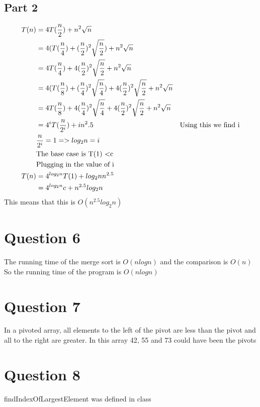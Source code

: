 \documentclass{article}
\begin{document}
    \subsection{Part 2}
        \begin{align*}
            T(n) &= 4T(\frac{n}{2}) + n^2\sqrt{n}\\
            &= 4(T(\frac{n}{4}) + (\frac{n}{2})^2 \sqrt{\frac{n}{2}}) + n^2\sqrt{n}\\
            &= 4T(\frac{n}{4}) + 4(\frac{n}{2})^2 \sqrt{\frac{n}{2}} + n^2\sqrt{n}\\
            &= 4(T(\frac{n}{8}) + (\frac{n}{4})^2 \sqrt{\frac{n}{4}}) + 4(\frac{n}{2})^2 \sqrt{\frac{n}{2}} + n^2\sqrt{n}\\
            &= 4T(\frac{n}{8}) + 4(\frac{n}{4})^2 \sqrt{\frac{n}{4}} + 4(\frac{n}{2})^2 \sqrt{\frac{n}{2}} + n^2\sqrt{n}\\
            &= 4^i T(\frac{n}{2^i}) + in^2.5
            &\textrm{Using this we find i}\\
            &\frac{n}{2^i} = 1 => log_2 n = i\\
            &\textrm{The base case is T(1) \textless c}\\
            &\textrm{Plugging in the value of i}\\
            T(n) &= 4^{log_2 n}T(1) + log_2 nn^{2.5}\\
            &= 4^{log_2 n}c + n^{2.5}log_2 n\\
        \end{align*}
        This means that this is $O(n^{2.5}log_2 n)$

\section{Question 6}
    

    The running time of the merge sort is $O(nlogn)$ and the comparison is $O(n)$
    So the running time of the program is $O(nlogn)$
\\
\section{Question 7}
    In a pivoted array, all elements to the left of the pivot are less than the pivot and all to the right are greater.
    In this array 42, 55 and 73 could have been the pivots

\section{Question 8}
    findIndexOfLargestElement was defined in class
\end{document}
